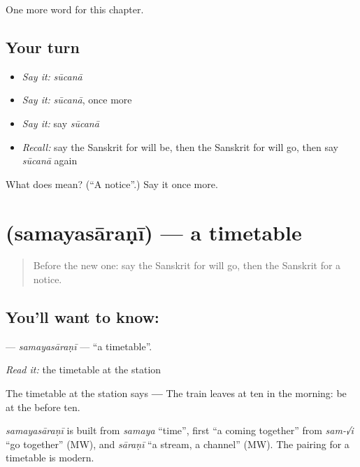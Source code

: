 \begin{grammarlens}[title={What you've built}]
One more word for this chapter.
\end{grammarlens}

\subsection*{Your turn}
\begin{itemize}
\raggedright
  \item \emph{Say it:} \emph{sūcanā}
  \item \emph{Say it:} \emph{sūcanā}, once more
  \item \emph{Say it:} say \emph{sūcanā}
  \item \emph{Recall:} say the Sanskrit for will be, then the Sanskrit for will go, then say \emph{sūcanā} again
\end{itemize}

\begin{tcolorbox}[breakable,colback=teal!4,colframe=teal!35!black,title={Before you move on}]
What does  mean? (\textquotedblleft{}A notice\textquotedblright{}.) Say it once more.
\end{tcolorbox}
\section[\texorpdfstring{\sk{समयसारणी} (samayasāraṇī)}{समयसारणी (samayasāraṇī)}]{ (samayasāraṇī) — a timetable}

\label{lesson:SA-C140-samayasarani}



\begin{quote}
Before the new one: say the Sanskrit for will go, then the Sanskrit for a notice.
\end{quote}

\subsection*{You'll want to know: }
\textbf{} — \emph{samayasāraṇī} — \textquotedblleft{}a timetable\textquotedblright{}.

\emph{Read it:} the timetable at the station

The timetable at the station says \textbf{ —  } The train leaves at ten in the morning: be at the \textbf{} before ten.

\begin{cousinweb}
\emph{samayasāraṇī} is built from \emph{samaya} \textquotedblleft{}time\textquotedblright{}, first \textquotedblleft{}a coming together\textquotedblright{} from \emph{sam-√i} \textquotedblleft{}go together\textquotedblright{} (MW), and \emph{sāraṇī} \textquotedblleft{}a stream, a channel\textquotedblright{} (MW). The pairing for a timetable is modern.
\end{cousinweb}

